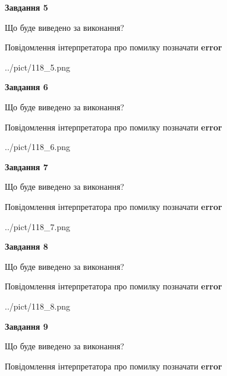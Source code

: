 \documentclass[11pt, ukrainian]{article}
\begin{document}
{\begin {large}
{\begin {center}\textbf{Завдання 5}\end {center}}\par
Що буде виведено за виконання? \par
Повідомлення інтерпретатора про помилку позначати \textbf{error}

\begin{center}
	{../pict/118_5.png}
\end{center}
\newpage

{\begin {center}\textbf{Завдання 6}\end {center}}\par
Що буде виведено за виконання? \par
Повідомлення інтерпретатора про помилку позначати \textbf{error}

\begin{center}
	{../pict/118_6.png}
\end{center}
\newpage

{\begin {center}\textbf{Завдання 7}\end {center}}\par
Що буде виведено за виконання? \par
Повідомлення інтерпретатора про помилку позначати \textbf{error}

\begin{center}
	{../pict/118_7.png}
\end{center}
\newpage

{\begin {center}\textbf{Завдання 8}\end {center}}\par
Що буде виведено за виконання? \par
Повідомлення інтерпретатора про помилку позначати \textbf{error}

\begin{center}
	{../pict/118_8.png}
\end{center}
\newpage

{\begin {center}\textbf{Завдання 9}\end {center}}\par
Що буде виведено за виконання? \par
Повідомлення інтерпретатора про помилку позначати \textbf{error}


\end{large}}
\end{document}
